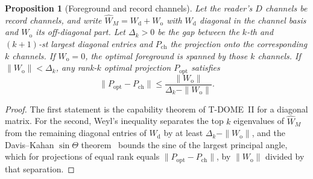 \documentclass[12pt]{article}
\newtheorem{proposition}[theorem]{Proposition}
\theoremstyle{definition}
\theoremstyle{remark}
\begin{document}
\begin{proposition}[Foreground and record channels]\label{prop:alignment}
Let the reader's \(D\) channels be record channels, and write
\(\widehat W_M=W_{\mathrm{d}}+W_{\mathrm{o}}\) with \(W_{\mathrm d}\) diagonal in the
channel basis and \(W_{\mathrm o}\) its off-diagonal part. Let \(\Delta_k>0\) be the gap
between the \(k\)-th and \((k+1)\)-st largest diagonal entries and \(P_{\mathrm{ch}}\)
the projection onto the corresponding \(k\) channels. If \(W_{\mathrm o}=0\), the
optimal foreground is spanned by those \(k\) channels. If
\(\|W_{\mathrm o}\|<\Delta_k\), any rank-\(k\) optimal projection \(P_{\mathrm{opt}}\) satisfies
\[
\|P_{\mathrm{opt}}-P_{\mathrm{ch}}\|\le\frac{\|W_{\mathrm o}\|}{\Delta_k-\|W_{\mathrm o}\|}.
\]
\end{proposition}

\begin{proof}
The first statement is the capability theorem of T-DOME~II for a diagonal matrix. For the
second, Weyl's inequality separates the top \(k\) eigenvalues of \(\widehat W_M\) from
the remaining diagonal entries of \(W_{\mathrm d}\) by at least
\(\Delta_k-\|W_{\mathrm o}\|\), and the Davis--Kahan \(\sin\Theta\)
theorem~\cite{DavisKahan1970} bounds the sine of the largest principal angle, which for
projections of equal rank equals \(\|P_{\mathrm{opt}}-P_{\mathrm{ch}}\|\), by
\(\|W_{\mathrm o}\|\) divided by that separation.
\end{proof}

\clearpage
{}
\end{document}

